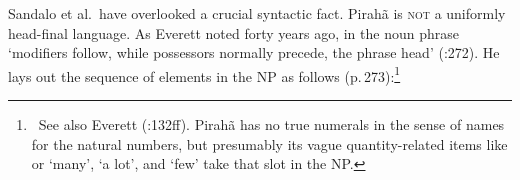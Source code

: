 \documentclass[output=paper,colorlinks,citecolor=brown
]{langscibook}
\begin{document}
\noindent
\hspace*{1.5em}
\hspace*{2em}

\noindent
Sandalo et al.\ have overlooked a crucial syntactic fact. Pirah{\~a} is
\textsc{not} a uniformly head-final language. As Everett noted forty
years ago, in the noun phrase `modifiers follow, while possessors normally
precede, the phrase head' (\citealt{Everett86HAL}:272). He lays out
the sequence of elements in the NP as follows (p.\,273):\footnote{\,
   See also Everett (\citeyear{Everett83}:132ff). Pirah{\~a} has no true
   numerals in the sense of names for the natural numbers, but presumably
   its vague quantity-related items like  or
    `many',
    `a lot', and
    `few' take that slot in the NP.}
\end{document}
